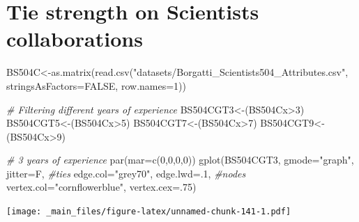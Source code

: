 \documentclass[
  notitlepage,
  onecolumn,
  openany]{book}
\newenvironment{Shaded}{\begin{snugshade}}{\end{snugshade}}
\newcommand{\AttributeTok}[1]{\textcolor[rgb]{0.77,0.63,0.00}{#1}}
\newcommand{\CommentTok}[1]{\textcolor[rgb]{0.56,0.35,0.01}{\textit{#1}}}
\newcommand{\ConstantTok}[1]{\textcolor[rgb]{0.00,0.00,0.00}{#1}}
\newcommand{\DecValTok}[1]{\textcolor[rgb]{0.00,0.00,0.81}{#1}}
\newcommand{\FunctionTok}[1]{\textcolor[rgb]{0.00,0.00,0.00}{#1}}
\newcommand{\NormalTok}[1]{#1}
\newcommand{\OtherTok}[1]{\textcolor[rgb]{0.56,0.35,0.01}{#1}}
\newcommand{\SpecialCharTok}[1]{\textcolor[rgb]{0.00,0.00,0.00}{#1}}
\newcommand{\StringTok}[1]{\textcolor[rgb]{0.31,0.60,0.02}{#1}}
\begin{document}
\hypertarget{tie-strength-on-scientists-collaborations}{%
\section{Tie strength on Scientists collaborations}\label{tie-strength-on-scientists-collaborations}}

\begin{Shaded}
\begin{Highlighting}[]
\NormalTok{BS504C}\OtherTok{\textless{}{-}}\FunctionTok{as.matrix}\NormalTok{(}\FunctionTok{read.csv}\NormalTok{(}\StringTok{"datasets/Borgatti\_Scientists504\_Attributes.csv"}\NormalTok{,}
                           \AttributeTok{stringsAsFactors=}\ConstantTok{FALSE}\NormalTok{, }\AttributeTok{row.names=}\DecValTok{1}\NormalTok{))}

\CommentTok{\# Filtering different years of experience}
\NormalTok{BS504CGT3}\OtherTok{\textless{}{-}}\NormalTok{(BS504Cx}\SpecialCharTok{\textgreater{}}\DecValTok{3}\NormalTok{)}
\NormalTok{BS504CGT5}\OtherTok{\textless{}{-}}\NormalTok{(BS504Cx}\SpecialCharTok{\textgreater{}}\DecValTok{5}\NormalTok{)}
\NormalTok{BS504CGT7}\OtherTok{\textless{}{-}}\NormalTok{(BS504Cx}\SpecialCharTok{\textgreater{}}\DecValTok{7}\NormalTok{)}
\NormalTok{BS504CGT9}\OtherTok{\textless{}{-}}\NormalTok{(BS504Cx}\SpecialCharTok{\textgreater{}}\DecValTok{9}\NormalTok{)}
\end{Highlighting}
\end{Shaded}

\begin{Shaded}
\begin{Highlighting}[]
\CommentTok{\# 3 years of experience}
\FunctionTok{par}\NormalTok{(}\AttributeTok{mar=}\FunctionTok{c}\NormalTok{(}\DecValTok{0}\NormalTok{,}\DecValTok{0}\NormalTok{,}\DecValTok{0}\NormalTok{,}\DecValTok{0}\NormalTok{))}
\FunctionTok{gplot}\NormalTok{(BS504CGT3,}
      \AttributeTok{gmode=}\StringTok{"graph"}\NormalTok{,}
      \AttributeTok{jitter=}\NormalTok{F,}
      \CommentTok{\#ties}
      \AttributeTok{edge.col=}\StringTok{"grey70"}\NormalTok{, }
      \AttributeTok{edge.lwd=}\NormalTok{.}\DecValTok{1}\NormalTok{,}
      \CommentTok{\#nodes}
      \AttributeTok{vertex.col=}\StringTok{"cornflowerblue"}\NormalTok{,}
      \AttributeTok{vertex.cex=}\NormalTok{.}\DecValTok{75}\NormalTok{)}
\end{Highlighting}
\end{Shaded}

\texttt{[image: \_main\_files/figure-latex/unnamed-chunk-141-1.pdf]}
\end{document}
